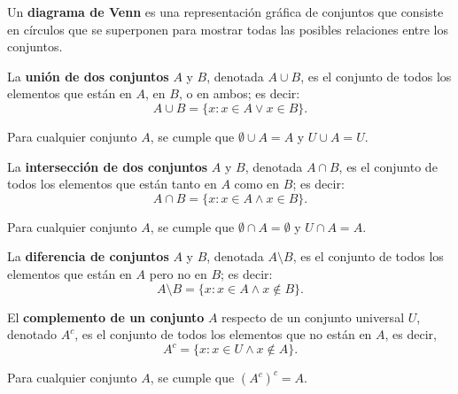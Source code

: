 \documentclass[a4,11pt]{aleph-notas}
\begin{document}
\begin{defi}
    Un \textbf{diagrama de Venn} es una representación gráfica de conjuntos que consiste en círculos que se superponen para mostrar todas las posibles relaciones entre los conjuntos.
\end{defi}

\begin{defi}
    La \textbf{unión de dos conjuntos} $A$ y $B$, denotada $A \cup B$, es el conjunto de todos los elementos que están en $A$, en $B$, o en ambos; es decir:
    \[
        A \cup B = \{x : x \in A \lor x \in B\}.
    \]
\end{defi}

\begin{teo}
    Para cualquier conjunto $A$, se cumple que $\emptyset \cup A = A$ y $U \cup A = U$.
\end{teo}

\begin{defi}
    La \textbf{intersección de dos conjuntos} $A$ y $B$, denotada $A \cap B$, es el conjunto de todos los elementos que están tanto en $A$ como en $B$; es decir:
    \[
        A \cap B = \{x : x \in A \land x \in B\}.
    \]
\end{defi}

\begin{teo}
    Para cualquier conjunto $A$, se cumple que $\emptyset \cap A = \emptyset$ y $U \cap A = A$.
\end{teo}

\begin{defi}
    La \textbf{diferencia de conjuntos} $A$ y $B$, denotada $A \setminus B$, es el conjunto de todos los elementos que están en $A$ pero no en $B$; es decir:
    \[
        A \setminus B = \{x : x \in A \land x \notin B\}.
    \]
\end{defi}

\begin{defi}
    El \textbf{complemento de un conjunto} $A$ respecto de un conjunto universal $U$, denotado $A^c$, es el conjunto de todos los elementos que no están en $A$, es decir,
    \[
        A^c = \{x : x \in U \land x \notin A\}.
    \]
\end{defi}

\begin{teo}
    Para cualquier conjunto $A$, se cumple que $(A^c)^c = A$.
\end{teo}
\end{document}
